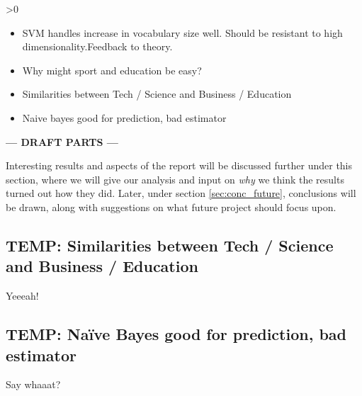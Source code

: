 \ifnum\printdraft>0
	\begin{itemize}
		\item SVM handles increase in vocabulary size well. Should be resistant to high dimensionality.Feedback to theory.
		\item Why might sport and education be easy?
		\item Similarities between Tech / Science and Business / Education
		\item Naive bayes good for prediction, bad estimator
	\end{itemize}
\else
\begin{center}
	\textbf{--- DRAFT PARTS ---}
\end{center}
\fi
Interesting results and aspects of the report will be discussed further under this section, where we will give our analysis and input on \emph{why} we think the results turned out how they did. Later, under section \ref{sec:conc_future}, conclusions will be drawn, along with suggestions on what future project should focus upon.

\subsection{TEMP: Similarities between Tech / Science and Business / Education} %
\label{sub:temp_similarities_between_tech_science_and_business_education}
Yeeeah!

\subsection{TEMP: Naïve Bayes good for prediction, bad estimator} %
\label{sub:temp_na_ve_bayes_good_for_prediction_bad_estimator}
Say whaaat?

